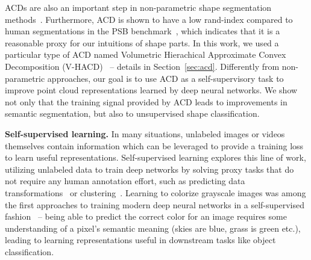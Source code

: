 ACDs are also an important step in non-parametric shape segmentation methods~\cite{acanalysis,concavityaware}.
Furthermore, ACD is shown to have a low rand-index compared to human segmentations in the PSB benchmark~\cite{acanalysis}, which
indicates that it is a reasonable proxy for our intuitions of shape parts.
In this work, we used a particular type of ACD named Volumetric Hierachical Approximate Convex Decomposition (V-HACD)~\cite{vhacd}
-- details in Section~\ref{sec:acd}.
Differently from non-parametric approaches, our goal is to use ACD as a self-supervisory task
to improve point cloud representations learned by deep neural networks.
We show not only that the training signal provided by ACD leads to improvements in semantic segmentation, but also to
unsupervised shape classification.

\noindent\textbf{Self-supervised learning.}
In many situations, unlabeled images or videos themselves contain information which can be leveraged to provide a training loss to learn useful representations. Self-supervised learning explores this line of work, utilizing unlabeled data to train deep networks by solving 
proxy tasks that do not require any human annotation effort, such as predicting data transformations~\cite{noroozi2016unsupervised,gidaris2018unsupervised,noroozi2018boosting} 
or clustering~\cite{caron2018deep,caron2019unsupervised}. 
%
Learning to colorize grayscale images was among the first  approaches to training modern
deep neural networks in a self-supervised fashion~\cite{larsson2016learning,zhang2016colorful,zhang2017split} -- being able to predict the correct color for an image requires some understanding of 
a pixel's semantic meaning (\eg skies are blue, grass is green etc.), leading to 
learning representations useful in downstream tasks like object classification. 
